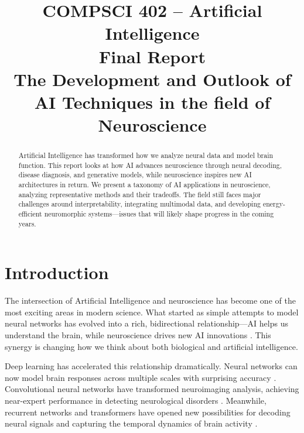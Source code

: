 \documentclass[conference]{IEEEtran}
\begin{document}
\title{COMPSCI 402 – Artificial Intelligence\\
Final Report\\
The Development and Outlook of AI Techniques in the field of Neuroscience
}

\author{
}

\maketitle

\begin{abstract}
Artificial Intelligence has transformed how we analyze neural data and model brain function. This report looks at how AI advances neuroscience through neural decoding, disease diagnosis, and generative models, while neuroscience inspires new AI architectures in return. We present a taxonomy of AI applications in neuroscience, analyzing representative methods and their tradeoffs. The field still faces major challenges around interpretability, integrating multimodal data, and developing energy-efficient neuromorphic systems—issues that will likely shape progress in the coming years.
\end{abstract}


%
%
%
\section{Introduction}

The intersection of Artificial Intelligence and neuroscience has become one of the most exciting areas in modern science. What started as simple attempts to model neural networks has evolved into a rich, bidirectional relationship—AI helps us understand the brain, while neuroscience drives new AI innovations \citep{onciulArtificialIntelligenceNeuroscience2025, hassabisNeuroscienceinspiredArtificialIntelligence2017}. This synergy is changing how we think about both biological and artificial intelligence.

Deep learning has accelerated this relationship dramatically. Neural networks can now model brain responses across multiple scales with surprising accuracy \citep{kietzmannDeepNeuralNetworks2019}. Convolutional neural networks have transformed neuroimaging analysis, achieving near-expert performance in detecting neurological disorders \citep{litjensSurveyDeepLearning2017}. Meanwhile, recurrent networks and transformers have opened new possibilities for decoding neural signals and capturing the temporal dynamics of brain activity \citep{lawhernEEGNetCompactConvolutional2018}.
\end{document}
